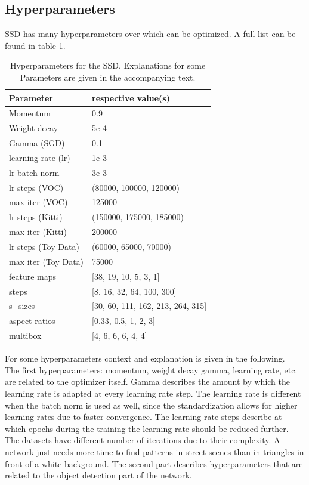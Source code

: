 \subsection{Hyperparameters}
\label{subsec:hyperparameters}

SSD has many hyperparameters over which can be optimized. A full list can be found in table \ref{table:hyperparameters}.

\begin{table}[!htb]
	\centering
	\caption{Hyperparameters for the SSD. Explanations for some Parameters are given in the accompanying text.}
	\begin{tabularx}{\textwidth}{ X  X}
		\hline
		Parameter & respective value(s) \\
		\hline
		Momentum & 0.9 \\ 
		Weight decay & 5e-4\\
		Gamma (SGD) & 0.1 \\
		learning rate (lr) & 1e-3 \\
		lr batch norm & 3e-3 \\
		lr steps (VOC) & (80000, 100000, 120000) \\
		max iter (VOC) & 125000 \\
		lr steps (Kitti)& (150000, 175000, 185000) \\
		max iter (Kitti) & 200000 \\
		lr steps (Toy Data) & (60000, 65000, 70000) \\
		max iter (Toy Data) & 75000 \\
		\hline
		feature maps & [38, 19, 10, 5, 3, 1] \\
		steps & [8, 16, 32, 64, 100, 300] \\
		s\_sizes & [30, 60, 111, 162, 213, 264, 315] \\
		aspect ratios & [0.33, 0.5, 1, 2, 3] \\
		multibox & [4, 6, 6, 6, 4, 4] \\
		\hline
	\end{tabularx}
	\label{table:hyperparameters}
\end{table}
For some hyperparameters context and explanation is given in the following. \\
The first hyperparameters: momentum, weight decay gamma, learning rate, etc. are related to the optimizer itself. Gamma describes the amount by which the learning rate is adapted at every learning rate step. The learning rate is different when the batch norm is used as well, since the standardization allows for higher learning rates due to faster convergence. The learning rate steps describe at which epochs during the training the learning rate should be reduced further. The datasets have different number of iterations due to their complexity. A network just needs more time to find patterns in street scenes than in triangles in front of a white background. The second part describes hyperparameters that are related to the object detection part of the network. 
